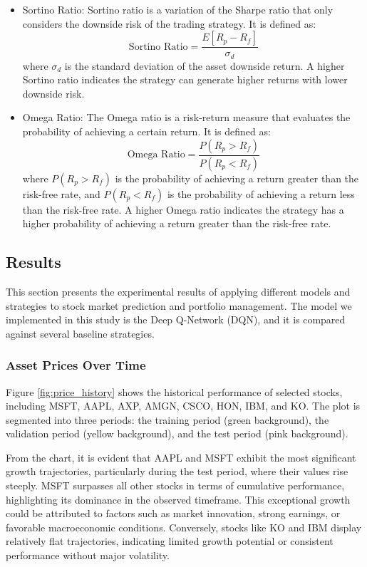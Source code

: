 \documentclass[conference]{IEEEtran}
\begin{document}
\begin{itemize}
  \item Sortino Ratio: Sortino ratio is a variation of the Sharpe ratio that only considers the downside risk of the trading strategy. It is defined as:
    \begin{equation}
      \text{Sortino Ratio} = \frac{E[R_p - R_f]}{\sigma_d}
    \end{equation}
    where $\sigma_d$ is the standard deviation of the asset downside return. A higher Sortino ratio indicates the strategy can generate higher returns with lower downside risk.
  \item Omega Ratio: The Omega ratio is a risk-return measure that evaluates the probability of achieving a certain return. It is defined as:
    \begin{equation}
      \text{Omega Ratio} = \frac{P(R_p > R_f)}{P(R_p < R_f)}
    \end{equation}
    where $P(R_p > R_f)$ is the probability of achieving a return greater than the risk-free rate, and $P(R_p < R_f)$ is the probability of achieving a return less than the risk-free rate. A higher Omega ratio indicates the strategy has a higher probability of achieving a return greater than the risk-free rate.
\end{itemize}

\subsection{Results}
This section presents the experimental results of applying different models and strategies to stock market prediction and portfolio management. The model we implemented in this study is the Deep Q-Network (DQN), and it is compared against several baseline strategies.

\subsubsection{Asset Prices Over Time}
Figure \ref{fig:price_history} shows the historical performance of selected stocks, including MSFT, AAPL, AXP, AMGN, CSCO, HON, IBM, and KO. The plot is segmented into three periods: the training period (green background), the validation period (yellow background), and the test period (pink background). 

From the chart, it is evident that AAPL and MSFT exhibit the most significant growth trajectories, particularly during the test period, where their values rise steeply. MSFT surpasses all other stocks in terms of cumulative performance, highlighting its dominance in the observed timeframe. This exceptional growth could be attributed to factors such as market innovation, strong earnings, or favorable macroeconomic conditions. Conversely, stocks like KO and IBM display relatively flat trajectories, indicating limited growth potential or consistent performance without major volatility. 
\end{document}
